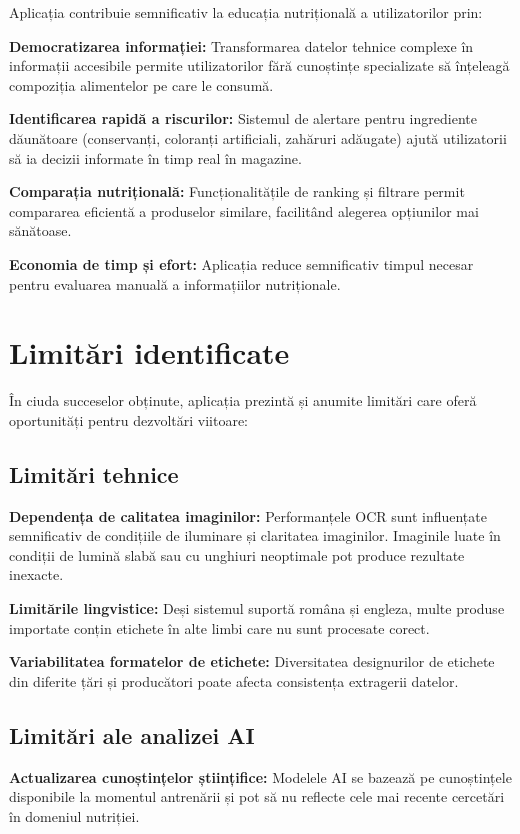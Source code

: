 Aplicația contribuie semnificativ la educația nutrițională a utilizatorilor prin:

\textbf{Democratizarea informației:} Transformarea datelor tehnice complexe în informații accesibile permite utilizatorilor fără cunoștințe specializate să înțeleagă compoziția alimentelor pe care le consumă.

\textbf{Identificarea rapidă a riscurilor:} Sistemul de alertare pentru ingrediente dăunătoare (conservanți, coloranți artificiali, zahăruri adăugate) ajută utilizatorii să ia decizii informate în timp real în magazine.

\textbf{Comparația nutrițională:} Funcționalitățile de ranking și filtrare permit compararea eficientă a produselor similare, facilitând alegerea opțiunilor mai sănătoase.

\textbf{Economia de timp și efort:} Aplicația reduce semnificativ timpul necesar pentru evaluarea manuală a informațiilor nutriționale.

\section{Limitări identificate}

În ciuda succeselor obținute, aplicația prezintă și anumite limitări care oferă oportunități pentru dezvoltări viitoare:

\subsection{Limitări tehnice}

\textbf{Dependența de calitatea imaginilor:} Performanțele OCR sunt influențate semnificativ de condițiile de iluminare și claritatea imaginilor. Imaginile luate în condiții de lumină slabă sau cu unghiuri neoptimale pot produce rezultate inexacte.

\textbf{Limitările lingvistice:} Deși sistemul suportă româna și engleza, multe produse importate conțin etichete în alte limbi care nu sunt procesate corect.

\textbf{Variabilitatea formatelor de etichete:} Diversitatea designurilor de etichete din diferite țări și producători poate afecta consistența extragerii datelor.

\subsection{Limitări ale analizei AI}

\textbf{Actualizarea cunoștințelor științifice:} Modelele AI se bazează pe cunoștințele disponibile la momentul antrenării și pot să nu reflecte cele mai recente cercetări în domeniul nutriției.

